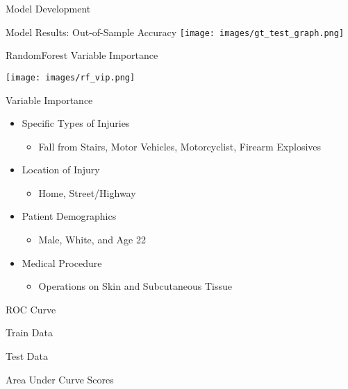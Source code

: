 \documentclass[
  ignorenonframetext,
]{beamer}
\providecommand{\tightlist}{%
  \setlength{\itemsep}{0pt}\setlength{\parskip}{0pt}}
\begin{document}
\begin{frame}{Model Development}
\begin{block}{Model Results: Out-of-Sample Accuracy}
\texttt{[image: images/gt\_test\_graph.png]}

\end{block}

\begin{block}{RandomForest Variable Importance}

\texttt{[image: images/rf\_vip.png]}

Variable Importance

\begin{itemize}
\tightlist
\item
  Specific Types of Injuries

  \begin{itemize}
  \tightlist
  \item
    Fall from Stairs, Motor Vehicles, Motorcyclist, Firearm Explosives
  \end{itemize}
\item
  Location of Injury

  \begin{itemize}
  \tightlist
  \item
    Home, Street/Highway
  \end{itemize}
\item
  Patient Demographics

  \begin{itemize}
  \tightlist
  \item
    Male, White, and Age 22
  \end{itemize}
\item
  Medical Procedure

  \begin{itemize}
  \tightlist
  \item
    Operations on Skin and Subcutaneous Tissue
  \end{itemize}
\end{itemize}

\end{block}

\begin{block}{ROC Curve}

Train Data

Test Data

\end{block}

\begin{block}{Area Under Curve Scores}

\end{block}

\end{frame}
\end{document}
